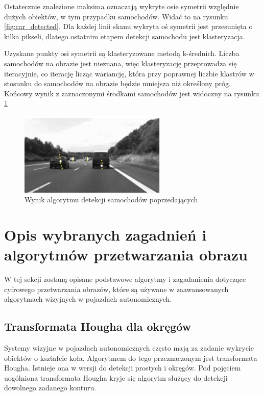 Ostatecznie znalezione maksima oznaczają wykryte osie symetrii względnie dużych obiektów, w tym przypadku samochodów. 
Widać to na rysunku \ref{fig:car_detected}. 
Dla każdej linii skanu wykryta oś symetrii jest przesunięta o kilka pikseli, dlatego ostatnim etapem detekcji samochodu jest klasteryzacja.

Uzyskane punkty osi symetrii są klasteryzowane metodą k-średnich. 
Liczba samochodów na obrazie jest nieznana, więc klasteryzację przeprowadza się iteracyjnie, co iterację licząc wariancję, która przy poprawnej liczbie klastrów w stosunku do samochodów na obrazie będzie mniejsza niż określony próg. 
Końcowy wynik z zaznaczonymi środkami samochodów jest widoczny na rysunku \ref{fig:car_end}

\begin{figure}
  \centering
  \includegraphics[width=7cm]{img/car_end.png}
  \caption{Wynik algorytmu detekcji samochodów poprzedających\cite{T1}}
  \label{fig:car_end}
\end{figure}




\section{Opis wybranych zagadnień i algorytmów przetwarzania obrazu}
\label{sec:vision_algs}
W tej sekcji zostaną opisane podstawowe algorytmy i zagadanienia dotyczące cyfrowego przetwarzania obrazów, które są używane w zaawansowanych algorytmach wizyjnych w pojazdach autonomicznych. %

\subsection{Transformata Hougha dla okręgów}

Systemy wizyjne w pojazdach autonomicznych często mają za zadanie wykrycie obiektów o kształcie koła. Algorytmem do tego przeznaczonym jest transformata Hougha. 
Istnieje ona w wersji do detekcji prostych i okręgów. 
Pod pojęciem uogólniona transformata Hougha kryje się algorytm służący do detekcji dowolnego zadanego konturu.

